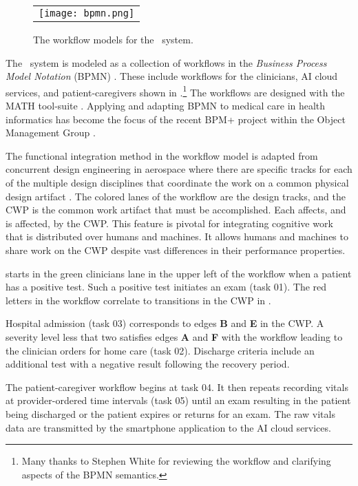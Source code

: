 \begin{figure*}[p]
  \begin{center}
    \begin{tabular}{c}
      \texttt{[image: bpmn.png]}
    \end{tabular}
  \end{center}
\caption{The workflow models for the \phware\ system.}
\label{fig:bpmn}
\end{figure*}

The \phware\ system is modeled as a collection of workflows in the \emph{Business Process Model Notation} (BPMN) \cite{BPMNSpecification}. These include workflows for the clinicians, AI cloud services, and patient-caregivers shown in .\footnote{Many thanks to Stephen White for reviewing the workflow and clarifying aspects of the BPMN semantics.} The workflows are designed with the MATH tool-suite \cite{workflowmodel}. Applying and adapting BPMN to medical care in health informatics has become the focus of the recent BPM+ project within the Object Management Group \cite{bpm}. 

The functional integration method in the workflow model is adapted from concurrent design engineering in aerospace where there are specific tracks for each of the multiple design disciplines that coordinate the work on a common physical design artifact \cite{10.1007/978-1-4471-1538-0_9}. The colored lanes of the workflow are the design tracks, and the CWP is the common work artifact that must be accomplished. Each affects, and is affected, by the CWP. This feature is pivotal for integrating cognitive work that is distributed over humans and machines. It allows humans and machines to share work on the CWP despite vast differences in their performance properties. 

 starts in the green clinicians lane in the upper left of the workflow when a patient has a positive test. Such a positive test initiates an exam (task 01). The red letters in the workflow correlate to transitions in the CWP in . 

Hospital admission (task 03) corresponds to edges \textbf{B} and \textbf{E} in the CWP. A severity level less that two satisfies edges \textbf{A} and \textbf{F} with the workflow leading to the clinician orders for home care (task 02). Discharge criteria include an additional test with a negative result following the recovery period.

The patient-caregiver workflow begins at task 04. It then repeats recording vitals at provider-ordered time intervals (task 05) until an exam resulting in the patient being discharged or the patient expires or returns for an exam. The raw vitals data are transmitted by the smartphone application to the AI cloud services. 

